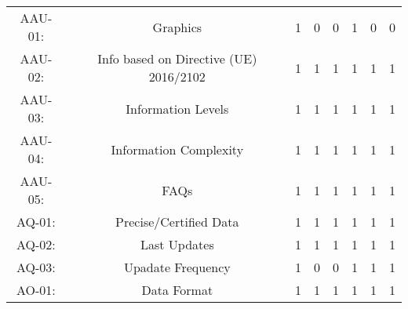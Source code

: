 \documentclass[a4paper, twoside]{report}
\begin{document}
\begin{table}[htbp]
\begin{adjustbox}{max width=\linewidth}
\begin{tabular}{rccccccc}
    \midrule
    \multicolumn{1}{c}{AAU-01:} & \multicolumn{1}{p{19em}}{Graphics} & 1     & 0     & 0     & 1     & 0     & 0 \\
    \multicolumn{1}{c}{AAU-02:} & \multicolumn{1}{p{19em}}{Info based on Directive (UE) 2016/2102} & 1     & 1     & 1     & 1     & 1     & 1 \\
    \multicolumn{1}{c}{AAU-03:} & \multicolumn{1}{p{19em}}{\cellcolor[rgb]{ .749,  .749,  .749}Information Levels} & \cellcolor[rgb]{ .749,  .749,  .749}1 & \cellcolor[rgb]{ .749,  .749,  .749}1 & \cellcolor[rgb]{ .749,  .749,  .749}1 & \cellcolor[rgb]{ .749,  .749,  .749}1 & \cellcolor[rgb]{ .749,  .749,  .749}1 & \cellcolor[rgb]{ .749,  .749,  .749}1 \\
    \multicolumn{1}{c}{AAU-04:} & \multicolumn{1}{p{19em}}{\cellcolor[rgb]{ .749,  .749,  .749}Information Complexity} & \cellcolor[rgb]{ .749,  .749,  .749}1 & \cellcolor[rgb]{ .749,  .749,  .749}1 & \cellcolor[rgb]{ .749,  .749,  .749}1 & \cellcolor[rgb]{ .749,  .749,  .749}1 & \cellcolor[rgb]{ .749,  .749,  .749}1 & \cellcolor[rgb]{ .749,  .749,  .749}1 \\
    \multicolumn{1}{c}{AAU-05:} & \multicolumn{1}{p{19em}}{\cellcolor[rgb]{ .749,  .749,  .749}FAQs} & \cellcolor[rgb]{ .749,  .749,  .749}1 & \cellcolor[rgb]{ .749,  .749,  .749}1 & \cellcolor[rgb]{ .749,  .749,  .749}1 & \cellcolor[rgb]{ .749,  .749,  .749}1 & \cellcolor[rgb]{ .749,  .749,  .749}1 & \cellcolor[rgb]{ .749,  .749,  .749}1 \\
    \midrule
    \multicolumn{1}{c}{AQ-01:} & \multicolumn{1}{p{19em}}{Precise/Certified Data} & 1     & 1     & 1     & 1     & 1     & 1 \\
    \multicolumn{1}{c}{AQ-02:} & \multicolumn{1}{p{19em}}{\cellcolor[rgb]{ .749,  .749,  .749}Last Updates} & \cellcolor[rgb]{ .749,  .749,  .749}1 & \cellcolor[rgb]{ .749,  .749,  .749}1 & \cellcolor[rgb]{ .749,  .749,  .749}1 & \cellcolor[rgb]{ .749,  .749,  .749}1 & \cellcolor[rgb]{ .749,  .749,  .749}1 & \cellcolor[rgb]{ .749,  .749,  .749}1 \\
    \multicolumn{1}{c}{AQ-03:} & \multicolumn{1}{p{19em}}{\cellcolor[rgb]{ .749,  .749,  .749}Upadate Frequency} & \cellcolor[rgb]{ .749,  .749,  .749}1 & \cellcolor[rgb]{ .749,  .749,  .749}0 & \cellcolor[rgb]{ .749,  .749,  .749}0 & \cellcolor[rgb]{ .749,  .749,  .749}1 & \cellcolor[rgb]{ .749,  .749,  .749}1 & \cellcolor[rgb]{ .749,  .749,  .749}1 \\
    \midrule
    \multicolumn{1}{c}{AO-01:} & \multicolumn{1}{p{19em}}{Data Format} & 1     & 1     & 1     & 1     & 1     & 1 \\

\end{tabular}
\end{adjustbox}
\end{table}
\end{document}
